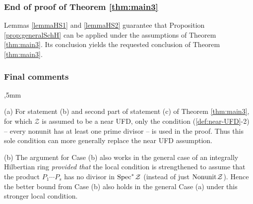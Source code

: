 \documentclass[11pt,a4paper,reqno]{amsart}
\theoremstyle{definition}
\begin{document}
\subsubsection{End of proof of Theorem \ref{thm:main3}}
\label{ssec:end-of-pf}
Lemmas \ref{lemmaHS1} and \ref{lemmaHS2} guarantee that Proposition \ref{prop:generalSchH} can be applied under the assumptions of Theorem \ref{thm:main3}. Its conclusion yields the requested conclusion of Theorem \ref{thm:main3}.




 



\subsubsection{Final comments} \hskip 1mm
,5mm

\noindent
(a) For statement (b) and second part of statement (c) of Theorem \ref{thm:main3}, for which ${\mathcal Z}$ is assumed to be a near UFD, only the condition (\ref{def:near-UFD}-2) -- every nonunit has at least one prime divisor -- is used in the proof. Thus this sole condition can more generally replace the near UFD assumption.
\vskip 1mm


\noindent
(b) The argument for Case (b) also works in the general case of an integrally Hilbertian ring 
\emph{provided that} the local condition is strengthened to assume that the product $P_1\cdots P_s$ has no divisor in ${\rm Spec}^\ast \hskip 1pt {\mathcal Z}$ (instead of just ${\rm Nonunit} \hskip 1pt {\mathcal Z}$). Hence the better bound from Case (b) also holds in the general Case (a) under this stronger local condition.
\end{document}

